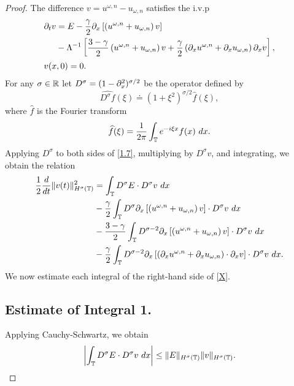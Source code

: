\begin{proof} The difference $v = u^{\omega,n} - u_{\omega,n}$ satisfies 
the i.v.p
\begin{align}
\label{1.7}
& \p_t v  =  E - \frac{\gamma}{2} \p_x
\left[ \left( u^{\omega,n} + u_{\omega,n} \right)v \right]
\\
\notag & \phantom{\p_t v} - \Lambda^{-1} \left[
\frac{3-\gamma}{2} \left( u^{\omega,n} + u_{\omega,n}
\right) v +
\frac{\gamma}{2}\left( \p_x u^{\omega,n} +
\p_x u_{\omega,n}
\right) \p_x v
\right], \\
& v(x,0)=0.
\end{align}
For any $\sigma \in \mathbb{R}$ let   $D^\sigma=(1-\partial_x^2)^{\sigma/2}$ be the  operator
defined by 
%
$$ \widehat{D^\sigma f}(\xi) \doteq (1 + \xi^2)^{\sigma/2} \widehat{f}(\xi), $$
%
where $ \widehat{f}$ is the Fourier transform
%
$$ \widehat{f}(\xi) =  \frac{1}{2\pi}\int_{\mathbb{T}} e^{-i \xi x} f(x) \ dx.  $$
%
%
Applying $D^\sigma$ to both sides of \eqref{1.7}, multiplying by
$D^\sigma v$, and integrating, we obtain the
relation
%
%
\begin{equation}
\begin{split}
\frac{1}{2}\frac{d}{dt}\|v(t)\|_{H^\sigma(\mathbb{T})}^2
& = \int_{\mathbb{T}} D^\sigma E \cdot D^\sigma
v \ dx
\\
&-
\frac{\gamma}{2}\int_{\mathbb{T}} D^\sigma
\partial_x \left[ \left( u^{\omega,n} + u_{\omega,n} \right)v
\right]\cdot D^\sigma v \ dx
\\
& -
\frac{3-\gamma}{2}\int_{\mathbb{T}} D^{\sigma
-2} \partial_x \left[ \left( u^{\omega,n} + u_{\omega,n}
\right)v \right] \cdot D^\sigma v \ dx
\\
& - \frac{\gamma}{2}\int_{\mathbb{T}} D^{\sigma
-2}
\partial_x \left[ \left( \partial_x u^{\omega,n} + \partial_x u_{\omega,n}
\right)\cdot \partial_x v \right] \cdot
D^\sigma v \ dx.
\label{X}
\end{split}
\end{equation}
%
%
We now estimate each integral of the right-hand side
of \eqref{X}.
\subsection*{Estimate of Integral 1.} Applying Cauchy-Schwartz, we obtain
%
%
\begin{equation}
\begin{split}
\left |\int_{\mathbb{T}} D^\sigma E \cdot D^\sigma v \ dx \right |
\le \|E\|_{H^\sigma(\mathbb{T})} \|v\|_{H^\sigma(\mathbb{T})}.
\label{est_for_1}
\end{split}
\end{equation}
%
%
%

\end{proof}
